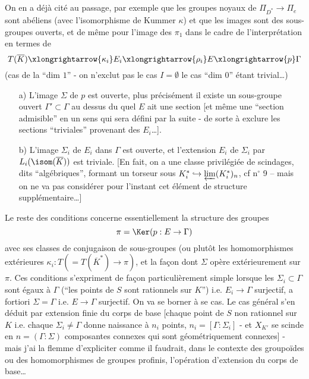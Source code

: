 \section*{}

On en a déjà cité au passage, par exemple que les groupes noyaux de $\Pi_{D^*} \to \Pi_e$ sont abéliens (avec l'isomorphisme de Kummer $\kappa$) et que les images sont des sous-groupes ouverts, et de même pour l'image des $\pi_1$ dans le cadre de l'interprétation en termes de
$$
T(\overline{K}) \xlongrightarrow{\kappa_i} E_i \xlongrightarrow{\rho_i} E \xlongrightarrow{p} \Gamma
$$
(cas de la ``dim $1$'' - on n'exclut pas le cas $I = \emptyset$ le cas ``dim $0$'' étant trivial\dots)

\begin{enumerate}
    \item[a)] L'image $\Sigma$ de $p$ est ouverte, plus précisément il existe un sous-groupe ouvert $\Gamma' \subset  \Gamma$ au dessus du quel $E$ ait une section [et même une ``section admisible'' en un sens qui sera défini par la suite - de sorte à exclure les sections ``triviales'' provenant des $E_i$\dots].
    \item[b)] L'image $\Sigma_i$ de $E_i$ dans $\Gamma$ est ouverte, et l'extension $E_i$ de $\Sigma_i$ par $L_i( \isom (\overline{K}))$ est triviale. [En fait, on a une classe privilégiée de scindages, dits ``algébriques'', formant un torseur sous $K^*_i \hookrightarrow \varprojlim(K^*_i)_n$, cf n$^\circ$ 9 -- mais on ne va pas considérer pour l'instant cet élément de structure supplémentaire\dots]
\end{enumerate}
Le reste des conditions concerne essentiellement la structure des groupes
$$
\pi = \Ker(p: E \to \Gamma)
$$
avec ses classes de conjugaison de sous-groupes (ou plutôt les homomorphismes extérieures $\kappa_i: T(= T(\overline{K}^*) \to \pi)$, et la fa\c{c}on dont $\Sigma$ opère extérieurement sur $\pi$. Ces conditions s'expriment de fa\c{c}on particulièrement simple lorsque les $\Sigma_i \subset  \Gamma$ sont égaux à $\Gamma$ (``les points de $S$ sont rationnels sur $K$'') i.e. $E_i \to \Gamma$ surjectif, a fortiori $\Sigma = \Gamma$ i.e. $E \to \Gamma$ surjectif. On va se borner à se cas. Le cas général s'en déduit par extension finie du corps   de base [chaque point de $S$ non rationnel sur $K$ i.e. chaque $\Sigma_i \neq \Gamma$ donne naissance à $n_i$ points, $n_i = [\Gamma : \Sigma_i]$ - et $X_{K'}$ se scinde en $n = (\Gamma : \Sigma)$ composantes connexes qui sont géométriquement connexes] - mais j'ai la flemme d'expliciter comme il faudrait, dans le contexte des groupoïdes ou des homomorphismes de groupes profinis, l'opération d'extension du corps de base\dots

